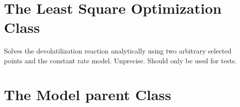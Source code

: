 \documentclass[letterpaper,10pt,english]{sphinxmanual}
\begin{document}
\section{The Least Square Optimization Class}
\label{FittingClasses:the-least-square-optimization-class}

\begin{fulllineitems}
Solves the devolatilization reaction analytically using two arbitrary selected points and the constant rate model. Unprecise. Should only be used for tests.

\end{fulllineitems}



\section{The Model parent Class}
\label{FittingClasses:the-model-parent-class}
\end{document}
